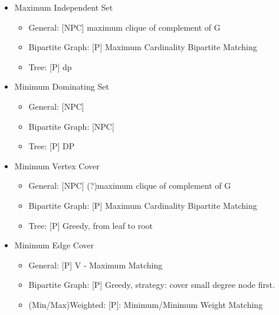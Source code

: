 \begin{itemize}
\item Maximum Independent Set 
	\begin{itemize}
	\item General: [NPC] maximum clique of complement of G
	\item Bipartite Graph: [P] Maximum Cardinality Bipartite Matching
	\item Tree: [P] dp
	\end{itemize}
\item Minimum Dominating Set
	\begin{itemize}
	\item General: [NPC]
	\item Bipartite Graph: [NPC]
	\item Tree: [P] DP
	\end{itemize}
\item Minimum Vertex Cover
	\begin{itemize}
	\item General: [NPC] (?)maximum clique of complement of G 
	\item Bipartite Graph: [P] Maximum Cardinality Bipartite Matching
	\item Tree: [P] Greedy, from leaf to root
	\end{itemize}
\item Minimum Edge Cover
	\begin{itemize}
	\item General: [P] V - Maximum Matching
	\item Bipartite Graph: [P] Greedy, strategy: cover small degree node first.
	\item (Min/Max)Weighted: [P]: Minimum/Minimum Weight Matching
	\end{itemize}
\end{itemize}